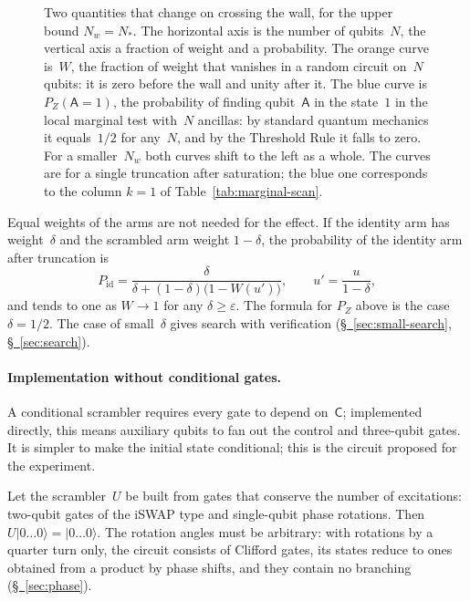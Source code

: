 \documentclass[11pt,a4paper]{article}
\newcommand{\qC}{\mathsf{C}}
\newcommand{\qA}{\mathsf{A}}
\newcommand{\CollapseRuleD}{the Threshold Rule}
\begin{document}
\begin{figure}[ht]
\centering

\caption{Two quantities that change on crossing the wall, for the upper bound $N_w=N_*$. The horizontal axis is the number of qubits~$N$, the vertical axis a fraction of weight and a probability. The orange curve is~$W$, the fraction of weight that vanishes in a random circuit on~$N$ qubits: it is zero before the wall and unity after it. The blue curve is $P_Z(\qA{=}1)$, the probability of finding qubit~$\qA$ in the state~$1$ in the local marginal test with~$N$ ancillas: by standard quantum mechanics it equals~$1/2$ for any~$N$, and by \CollapseRuleD{} it falls to zero. For a smaller~$N_w$ both curves shift to the left as a whole. The curves are for a single truncation after saturation; the blue one corresponds to the column $k=1$ of Table~\ref{tab:marginal-scan}.}
\label{fig:front}
\end{figure}

Equal weights of the arms are not needed for the effect. If the identity arm has weight~$\delta$ and the scrambled arm weight $1-\delta$, the probability of the identity arm after truncation is
\begin{equation}
P_{\mathrm{id}}=\frac{\delta}{\delta+(1-\delta)\bigl(1-W(u')\bigr)},
\qquad
u'=\frac{u}{1-\delta},
\end{equation}
and tends to one as $W\to1$ for any $\delta\ge\varepsilon$. The formula for $P_Z$ above is the case $\delta=1/2$. The case of small~$\delta$ gives search with verification (\hyperref[sec:small-search]{\S~\ref*{sec:small-search}}, \hyperref[sec:search]{\S~\ref*{sec:search}}).

\paragraph{Implementation without conditional gates.}
\label{sec:unconditional}
A conditional scrambler requires every gate to depend on~$\qC$; implemented directly, this means auxiliary qubits to fan out the control and three-qubit gates. It is simpler to make the initial state conditional; this is the circuit proposed for the experiment.

Let the scrambler~$U$ be built from gates that conserve the number of excitations: two-qubit gates of the iSWAP type and single-qubit phase rotations. Then $U|0\ldots0\rangle=|0\ldots0\rangle$. The rotation angles must be arbitrary: with rotations by a quarter turn only, the circuit consists of Clifford gates, its states reduce to ones obtained from a product by phase shifts, and they contain no branching (\hyperref[sec:phase]{\S~\ref*{sec:phase}}).
\end{document}
